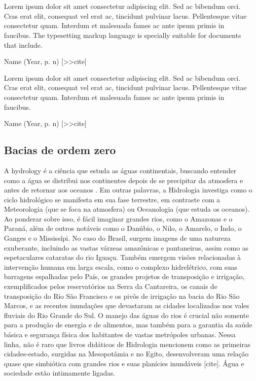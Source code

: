 \documentclass[./main.tex]{subfiles}
\begin{document}
\chapter{\chapHydro} \label{chap:hydrology}

\setlength{\parskip}{0mm}

\epigraph{\small{Lorem ipsum dolor sit amet consectetur adipiscing elit. Sed ac bibendum orci. Cras erat elit, consequat vel erat ac, tincidunt pulvinar lacus. Pellentesque vitae consectetur quam. Interdum et malesuada fames ac ante ipsum primis in faucibus. The typesetting markup language is specially suitable for documents that include.}}{Name (Year, p. n) [>>cite]}

\epigraph{\small{Lorem ipsum dolor sit amet consectetur adipiscing elit. Sed ac bibendum orci. Cras erat elit, consequat vel erat ac, tincidunt pulvinar lacus. Pellentesque vitae consectetur quam. Interdum et malesuada fames ac ante ipsum primis in faucibus.}}{Name (Year, p. n) [>>cite]}

\setlength{\parskip}{\myparskip}

\section{Bacias de ordem zero} \label{sec:hydro:intro}

\par A \gls{hydrology} é a ciência que estuda as águas continentais, buscando entender como a água se distribui nos continentes depois de se precipitar da atmosfera e antes de retornar aos oceanos \cite{chow1964}. Em outras palavras, a Hidrologia investiga como o ciclo hidrológico se manifesta em sua fase terrestre, em contraste com a Meteorologia (que se foca na atmosfera) ou Oceanologia (que estuda os oceanos). Ao ponderar sobre isso, é fácil imaginar grandes rios, como o Amazonas e o Paraná, além de outros notáveis como o Danúbio, o Nilo, o Amarelo, o Indo, o Ganges e o Mississípi. No caso do Brasil, surgem imagens de uma natureza exuberante, incluindo as vastas várzeas amazônicas e pantaneiras, assim como as espetaculares cataratas do rio Iguaçu. Também emergem visões relacionadas à intervenção humana em larga escala, como o complexo hidrelétrico, com suas barragens espalhadas pelo País, os grandes projetos de transposição e irrigação, exemplificados pelos reservatórios na Serra da Cantareira, os canais de transposição do Rio São Francisco e os pivôs de irrigação na bacia do Rio São Marcos, e as recentes inundações que devastaram as cidades localizadas nos vales fluviais do Rio Grande do Sul. O manejo das águas do rios é crucial não somente para a produção de energia e de alimentos, mas também para a garantia da saúde básica e segurança física dos habitantes de vastas metrópoles urbanas. Nessa linha, não é raro que livros didáticos de Hidrologia mencionem como as primeiras cidades-estado, surgidas na Mesopotâmia e no Egito, desenvolveram uma relação quase que simbiótica com grandes rios e suas planícies inundáveis [cite]. Água e sociedade estão intimamente ligadas. 
\end{document}
